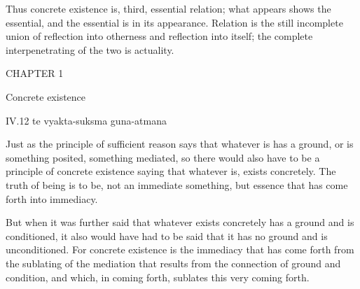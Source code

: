 Thus concrete existence is, third, essential relation;
what appears shows the essential,
and the essential is in its appearance.
Relation is the still incomplete union of
reflection into otherness and reflection into itself;
the complete interpenetrating of the two is actuality.

CHAPTER 1

Concrete existence

IV.12
te vyakta-suksma guna-atmana

Just as the principle of sufficient reason says
that whatever is has a ground,
or is something posited,
something mediated,
so there would also have to be
a principle of concrete existence saying
that whatever is, exists concretely.
The truth of being is to be,
not an immediate something,
but essence that has
come forth into immediacy.

But when it was further said
that whatever exists concretely
has a ground and is conditioned,
it also would have had to be said
that it has no ground and is unconditioned.
For concrete existence is the immediacy
that has come forth from the sublating
of the mediation that results
from the connection of ground and condition,
and which, in coming forth,
sublates this very coming forth.

